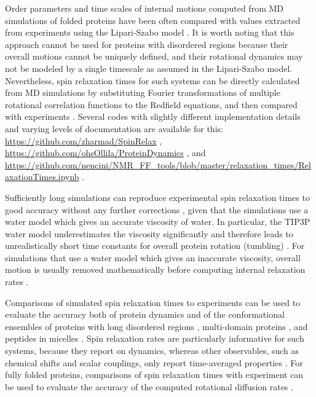 \documentclass[9pt,review]{livecoms}
\begin{document}
Order parameters and time scales of internal motions computed from MD simulations of folded proteins have been often compared with values extracted from experiments using the Lipari-Szabo model \cite{lipari_protein_1982,best_determination_2004,showalter_toward_2007,showalter_validation_2007,maragakis_microsecond_2008,trbovic_structural_2008,fenwick_classic_2016}.
It is worth noting that this approach cannot be used for proteins with disordered regions because their overall motions cannot be uniquely defined, and their rotational dynamics may not be modeled by a single timescale as assumed in the Lipari-Szabo model.
Nevertheless, spin relaxation times for such systems can be directly calculated from MD simulations by substituting Fourier transformations of multiple rotational correlation functions to the Redfield equations, and then compared with experiments \cite{chen_ab_2018,ollila_rotational_2018,hoffmann_predicting_2020,virtanen_heterogeneous_2020}.
Several codes with slightly different implementation details and varying levels of documentation are available for this: \url{https://github.com/zharmad/SpinRelax} \cite{chen_ab_2018}, \url{https://github.com/ohsOllila/ProteinDynamics} \cite{ollila_rotational_2018}, and \url{https://github.com/nencini/NMR_FF_tools/blob/master/relaxation_times/RelaxationTimes.ipynb} \cite{nencini_probing_2024}.

Sufficiently long simulations \cite{bowman_accurately_2016} can reproduce experimental spin relaxation times to good accuracy without any further corrections \cite{virtanen_heterogeneous_2020}, given that the simulations use a water model which gives an accurate viscosity of water.
In particular, the TIP3P water model \cite{jorgensen_comparison_1983} underestimates the viscosity significantly and therefore leads to unrealistically short time constants for overall protein rotation (tumbling) \cite{wong_evaluating_2008}.
For simulations that use a water model which gives an inaccurate viscosity, overall motion is usually removed mathematically before computing internal relaxation rates \cite{prompers_general_2002,wong_evaluating_2008,anderson_rotational_2012,chen_ab_2018,hoffmann_accurate_2018,ollila_rotational_2018}.

Comparisons of simulated spin relaxation times to experiments can be used to evaluate the accuracy both of protein dynamics and of the conformational ensembles of proteins with long disordered regions \cite{lindorff2012structure,virtanen_heterogeneous_2020}, multi-domain proteins \cite{sandelin_qebss_2024}, and peptides in micelles \cite{nencini_probing_2024}.
Spin relaxation rates are particularly informative for such systems, because they report on dynamics, whereas other observables, such as chemical shifts and scalar couplings, only report time-averaged properties \cite{virtanen_heterogeneous_2020}.
For fully folded proteins, comparisons of spin relaxation times with experiment can be used to evaluate the accuracy of the computed rotational diffusion rates \cite{ollila_rotational_2018}.
\end{document}

